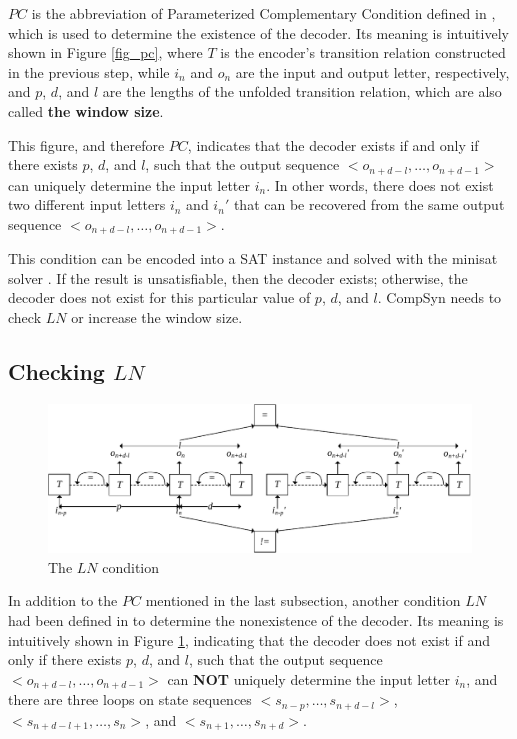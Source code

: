 \documentclass[runningheads,a4paper]{llncs}
\begin{document}
$PC$ is the abbreviation of Parameterized Complementary Condition defined in \cite{ShengYuShen:iccad09},
which is used to determine the existence of the decoder.
Its meaning is intuitively shown in Figure \ref{fig_pc},
where $T$ is the encoder's transition relation constructed in the previous step,
while $i_n$ and $o_n$ are the input and output letter,
respectively,
and $p$, $d$, and $l$ are the lengths of the unfolded transition relation,
which are also called \textbf{the window size}.

This figure,
and therefore $PC$,
indicates that the decoder exists if and only if there exists $p$, $d$, and $l$,
such that the output sequence $<o_{n+d-l},\dots,o_{n+d-1}>$ can uniquely determine the input letter $i_n$.
In other words,
there does not exist two different input letters $i_n$ and $i_n'$ that can be recovered from the same output sequence $<o_{n+d-l},\dots,o_{n+d-1}>$.

This condition can be encoded into a SAT instance and solved with the minisat solver \cite{EXTSAT}.
If the result is unsatisfiable,
then the decoder exists;
otherwise,
the decoder does not exist for this particular value of $p$, $d$, and $l$.
CompSyn needs to check $LN$ or increase the window size.

\subsection{Checking $LN$}
\begin{figure}[t]
\begin{center}
\includegraphics[width=\textwidth]{ln}
\end{center}
\caption{The $LN$ condition}
  \label{fig_ln}
\end{figure}

In addition to the $PC$ mentioned in the last subsection,
another condition $LN$ had been defined in \cite{ShengYuShen:tcad11} to determine the nonexistence of the decoder.
Its meaning is intuitively shown in Figure \ref{fig_ln},
indicating that the decoder does not exist if and only if there exists $p$, $d$, and $l$,
such that the output sequence $<o_{n+d-l},\dots,o_{n+d-1}>$ can \textbf{NOT} uniquely determine the input letter $i_n$,
and there are three loops on state sequences $<s_{n-p},\dots,s_{n+d-l}>$,$<s_{n+d-l+1},\dots,s_n>$, and $<s_{n+1},\dots,s_{n+d}>$.
\end{document}
